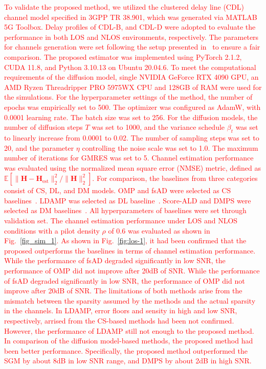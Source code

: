 \documentclass[lettersize,journal]{IEEEtran}
\begin{document}
\textcolor{red}{
To validate the proposed method, we utilized the clustered delay line (CDL)
channel model specified in 3GPP TR 38.901, which was generated via MATLAB 5G
Toolbox. Delay profiles of CDL-B, and CDL-D were adopted to evaluate the
performance in both LOS and NLOS environments, respectively. The parameters for channels
generation were set following the setup presented in~\cite{arvinteMIMOChannelEstimation2023} to ensure a fair comparison.
}
\textcolor{red}{
The proposed estimator was implemented using PyTorch 2.1.2, CUDA 11.8, and Python 3.10.13 on Ubuntu 20.04.6. To meet the computational requirements of the diffusion model, single NVIDIA GeForce RTX 4090 GPU, an AMD Ryzen Threadripper PRO 5975WX CPU and 128GB of RAM were used for the simulations. For the hyperparameter settings of the method, the number of epochs was empirically set to 500. The optimizer was configured as AdamW, with 0.0001 learning rate. The batch size was set to 256. %
For the diffusion models, the number of diffusion steps $T$ was set to 1000, and the variance schedule $\beta_{t}$ was set to linearly increase from 0.0001 to 0.02. The number of sampling steps was set to 20, and the parameter $\eta$ controlling the noise scale was set to 1.0. The maximum number of iterations for GMRES was set to 5.
}
\textcolor{red}{
Channel estimation performance was evaluated using the normalized mean square error (NMSE) metric, defined as $\mathbb{E}[\|\mathbf{H}-\mathbf{H}_{\text{est}}\|_{2}^{2} / \|\mathbf{H}\|_{2}^{2}]$. For comparison, the baselines from three categories consist of CS, DL, and DM models. OMP and fsAD were selected as CS baselines~\cite{mendez-rialHybridMIMOArchitectures2016,zhangAtomicNormDenoisingBased2018}. LDAMP was selected as DL baseline~\cite{heDeepLearningBasedChannel2018}. Score-ALD and DMPS were selected as DM baselines~\cite{arvinteMIMOChannelEstimation2023,zhouGenerativeDiffusionModels2025}. All hyperparameters of baselines were set through validation set.
}
\textcolor{red}{
The channel estimation performance under LOS and NLOS conditions with a pilot density $\rho$ of 0.6 was evaluated as shown in Fig.~\ref{fig_sim_1}. As shown in Fig.~\ref{fig:los-1}, it had been confirmed that the proposed outperforms the baselines in terms of channel estimation performance. While the performance of fsAD degraded significantly in low SNR, the performance of OMP did not improve after 20dB of SNR. While the performance of fsAD degraded significantly in low SNR, the performance of OMP did not improve after 20dB of SNR. The limitations of both methods arise from the mismatch between the sparsity assumed by the methods and the actual sparsity in the channels. In LDAMP, error floors and sensity in high and low SNR, respectively, arrised from the CS-based methods had been not confirmed. However, the performance of LDAMP still not enough to the proposed method. In comparison of the diffusion model-based methods, the proposed method had been better performance. Specifically, the proposed method outperformed the SGM by about 8dB in low SNR range, and DMPS by about 2dB in high SNR.
}
\end{document}
